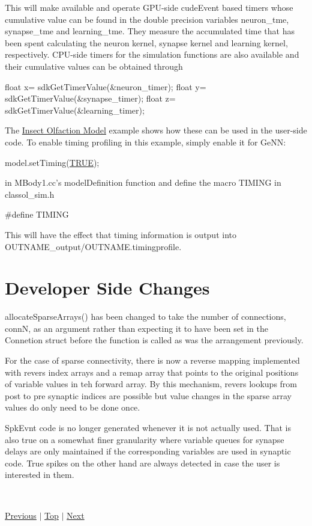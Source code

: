 \begin{DoxyEnumerate}
 This will make available and operate G\+P\+U-\/side cude\+Event based timers whose cumulative value can be found in the double precision variables {\ttfamily neuron\+\_\+tme}, {\ttfamily synapse\+\_\+tme} and {\ttfamily learning\+\_\+tme}. They measure the accumulated time that has been spent calculating the neuron kernel, synapse kernel and learning kernel, respectively. C\+P\+U-\/side timers for the simulation functions are also available and their cumulative values can be obtained through 
\begin{DoxyCode}
\textcolor{keywordtype}{float} x= sdkGetTimerValue(&neuron\_timer);
\textcolor{keywordtype}{float} y= sdkGetTimerValue(&synapse\_timer);
\textcolor{keywordtype}{float} z= sdkGetTimerValue(&learning\_timer);
\end{DoxyCode}
 The \hyperlink{Examples_ex_mbody}{Insect Olfaction Model} example shows how these can be used in the user-\/side code. To enable timing profiling in this example, simply enable it for Ge\+N\+N\+: 
\begin{DoxyCode}
model.setTiming(\hyperlink{modelSpec_8h_aa8cecfc5c5c054d2875c03e77b7be15d}{TRUE});
\end{DoxyCode}
 in {\ttfamily M\+Body1.\+cc}'s {\ttfamily model\+Definition} function and define the macro {\ttfamily T\+I\+M\+I\+N\+G} in {\ttfamily classol\+\_\+sim.\+h} 
\begin{DoxyCode}
\textcolor{preprocessor}{#define TIMING}
\end{DoxyCode}
 This will have the effect that timing information is output into {\ttfamily O\+U\+T\+N\+A\+M\+E\+\_\+output/\+O\+U\+T\+N\+A\+M\+E.\+timingprofile}.
\end{DoxyEnumerate}\hypertarget{ReleaseNotes_developerChange}{}\section{Developer Side Changes}\label{ReleaseNotes_developerChange}

\begin{DoxyEnumerate}
\item {\ttfamily allocate\+Sparse\+Arrays()} has been changed to take the number of connections, conn\+N, as an argument rather than expecting it to have been set in the Connetion struct before the function is called as was the arrangement previously.
\item For the case of sparse connectivity, there is now a reverse mapping implemented with revers index arrays and a remap array that points to the original positions of variable values in teh forward array. By this mechanism, revers lookups from post to pre synaptic indices are possible but value changes in the sparse array values do only need to be done once.
\item Spk\+Evnt code is no longer generated whenever it is not actually used. That is also true on a somewhat finer granularity where variable queues for synapse delays are only maintained if the corresponding variables are used in synaptic code. True spikes on the other hand are always detected in case the user is interested in them.
\end{DoxyEnumerate}

~\newline
 

 \hyperlink{Examples}{Previous} $\vert$ \hyperlink{ReleaseNotes}{Top} $\vert$ \hyperlink{UserManual}{Next} 